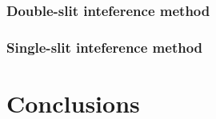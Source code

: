 \documentclass[letter,12pt]{article}
\numberwithin{equation}{section}
\numberwithin{figure}{section}
\numberwithin{table}{section}
\begin{document}
\subsubsection{Double-slit inteference method}

\subsubsection{Single-slit inteference method}

\section{Conclusions}
\end{document}
